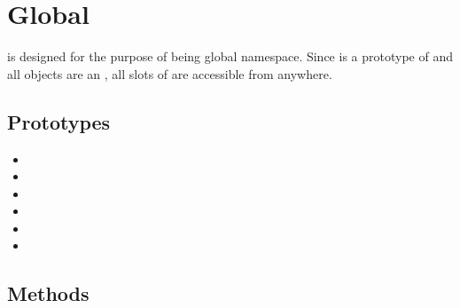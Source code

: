 \section{Global}

 is designed for the purpose of being global
namespace. Since  is a prototype of  and all
objects are an , all slots of  are accessible from
anywhere.

\subsection{Prototypes}
\begin{itemize}
\item {}
\item {}
\item {}
\item {}
\item {}
\item {}
\end{itemize}

\subsection{Methods}

